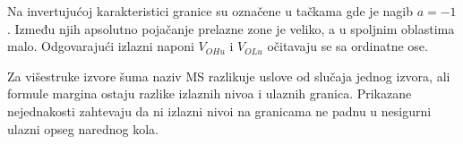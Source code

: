 Na invertujućoj karakteristici granice su označene u tačkama gde je nagib $a=-1$. Između njih apsolutno pojačanje prelazne zone je veliko, a u spoljnim oblastima malo. Odgovarajući izlazni naponi $V_{OHu}$ i $V_{OLu}$ očitavaju se sa ordinatne ose.

Za višestruke izvore šuma naziv MS razlikuje uslove od slučaja jednog izvora, ali formule margina ostaju razlike izlaznih nivoa i ulaznih granica. Prikazane nejednakosti zahtevaju da ni izlazni nivoi na granicama ne padnu u nesigurni ulazni opseg narednog kola.
